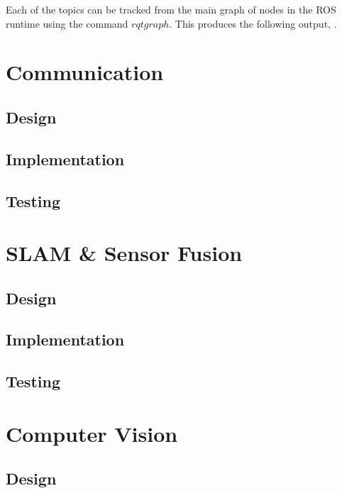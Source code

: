 Each of the topics can be tracked from the main graph of nodes in the ROS runtime using the command $rqt graph$. This produces the following output, . 


\section{Communication}\label{soft/comms}

\subsection{Design}\label{soft/comms/design}

\subsection{Implementation}\label{soft/comms/impl}

\subsection{Testing}\label{soft/comms/test}




\section{SLAM \& Sensor Fusion}\label{soft/SLAM}

\subsection{Design}\label{soft/SLAM/design}

\subsection{Implementation}\label{soft/SLAM/impl}

\subsection{Testing}\label{soft/SLAM/test}



\section{Computer Vision}\label{soft/cv}

\subsection{Design}\label{soft/cv/design}

